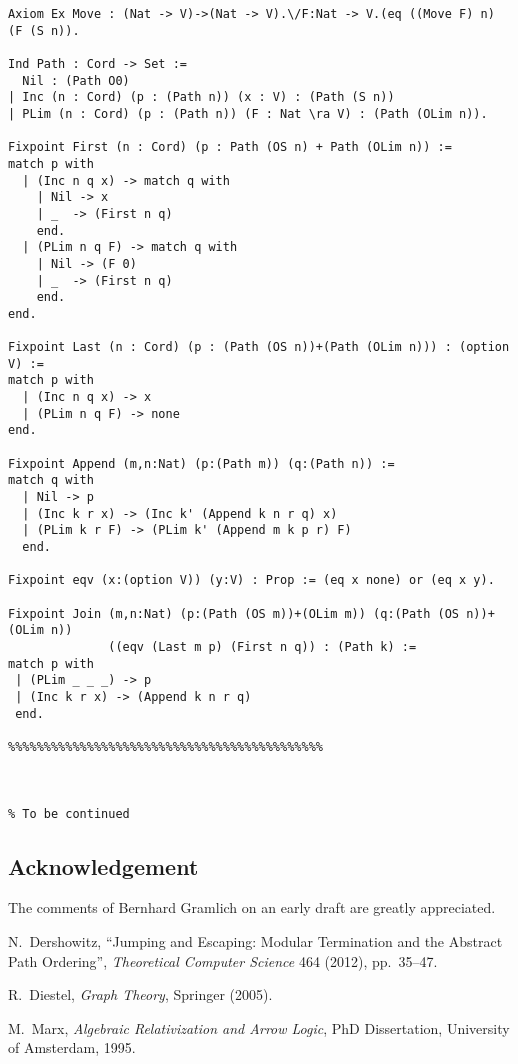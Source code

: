 \documentclass{llncs}
\begin{document}
{\begin{verbatim}
Axiom Ex Move : (Nat -> V)->(Nat -> V).\/F:Nat -> V.(eq ((Move F) n) (F (S n)).

Ind Path : Cord -> Set :=
  Nil : (Path O0)
| Inc (n : Cord) (p : (Path n)) (x : V) : (Path (S n))
| PLim (n : Cord) (p : (Path n)) (F : Nat \ra V) : (Path (OLim n)).

Fixpoint First (n : Cord) (p : Path (OS n) + Path (OLim n)) :=
match p with 
  | (Inc n q x) -> match q with 
    | Nil -> x
    | _  -> (First n q)
    end.
  | (PLim n q F) -> match q with 
    | Nil -> (F 0)
    | _  -> (First n q)
    end.
end.

Fixpoint Last (n : Cord) (p : (Path (OS n))+(Path (OLim n))) : (option V) := 
match p with 
  | (Inc n q x) -> x
  | (PLim n q F) -> none
end.

Fixpoint Append (m,n:Nat) (p:(Path m)) (q:(Path n)) := 
match q with
  | Nil -> p
  | (Inc k r x) -> (Inc k' (Append k n r q) x)
  | (PLim k r F) -> (PLim k' (Append m k p r) F)
  end.

Fixpoint eqv (x:(option V)) (y:V) : Prop := (eq x none) or (eq x y).

Fixpoint Join (m,n:Nat) (p:(Path (OS m))+(OLim m)) (q:(Path (OS n))+(OLim n))
              ((eqv (Last m p) (First n q)) : (Path k) :=
match p with
 | (PLim _ _ _) -> p
 | (Inc k r x) -> (Append k n r q)
 end.
 
%%%%%%%%%%%%%%%%%%%%%%%%%%%%%%%%%%%%%%%%%%%%


 
% To be continued

\end{verbatim}
}

\subsection*{Acknowledgement}
The comments of
Bernhard Gramlich
on an early draft are greatly appreciated.

\begin{thebibliography}{9}
N.\ Dershowitz, ``Jumping and Escaping: Modular Termination and the Abstract Path Ordering'', \textit{Theoretical Computer Science} 464 (2012),
pp.\ 35--47.

R.\ Diestel, \emph{Graph Theory}, Springer (2005).

M.\ Marx,
  \emph{Algebraic Relativization and Arrow Logic}, PhD Dissertation,
  University of Amsterdam, 1995.
  
\end{thebibliography}
\end{document}
